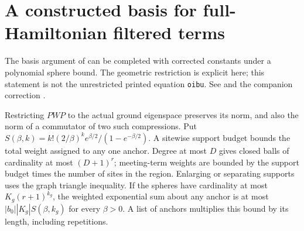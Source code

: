 \section{A constructed basis for full-Hamiltonian filtered terms}

The basis argument of \cite{Hastings2006Solving} can be completed with
corrected constants under a polynomial sphere bound. The geometric
restriction is explicit here; this statement is not the unrestricted
printed equation \texttt{oibu}. See \cite{gap:hastings05_two_dim_ground_basis}
and the companion correction \cite{gap:hastings05_basis_refinement}.

\begin{lemma}
    \label{lem:hastings_full_hamiltonian_basis_inputs}
    \leanok

    \leanok

    \leanok

    \leanok

    Restricting $PWP$ to the actual ground eigenspace preserves its norm,
    and also the norm of a commutator of two such compressions.
    Put $S(\beta,k)=k!(2/\beta)^k e^{\beta/2}/(1-e^{-\beta/2})$.
    A sitewise support budget bounds the total weight assigned to any
    one anchor. Degree at most $D$ gives closed balls of cardinality at most
    $(D+1)^r$; meeting-term weights are bounded by the support budget times
    the number of sites in the region. Enlarging or separating supports uses
    the graph triangle inequality. If the spheres have cardinality at most $K_g(r+1)^{k_g}$,
    the weighted exponential sum about any anchor is at most
    $|b_0||K_g|S(\beta,k_g)$ for every $\beta>0$. A list of anchors
    multiplies this bound by its length, including repetitions.
\end{lemma}
